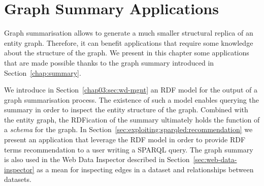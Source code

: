 \chapter{Graph Summary Applications}
\label{chap:system}

Graph summarisation allows to generate a much smaller structural replica of an entity graph. Therefore, it can benefit applications that require some knowledge about the structure of the graph. We present in this chapter some applications that are made possible thanks to the graph summary introduced in Section~\ref{chap:summary}.

We introduce in Section~\ref{chap03:sec:wd-mgnt} an RDF model for the output of a graph summarisation process. The existence of such a model enables querying the summary in order to inspect the entity structure of the graph. Combined with the entity graph, the RDFication of the summary ultimately holds the function of a \emph{schema} for the graph. In Section~\ref{sec:exploiting:sparqled:recommendation} we present an application that leverage the RDF model in order to provide RDF terms recommendation to a user writing a SPARQL query. The graph summary is also used in the Web Data Inspector described in Section~\ref{sec:web-data-inspector} as a mean for inspecting edges in a dataset and relationships between datasets.

